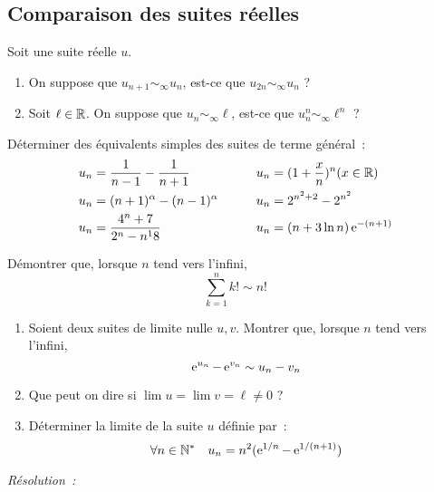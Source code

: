 \subsection{Comparaison des suites réelles}
\begin{exercice}
    Soit une suite réelle \(u\).
    \begin{enumerate}
        \item On suppose que \(u_{n+1} \sim_{\infty} u_n\), est-ce que \(u_{2n} \sim_{\infty} u_n\) ?
        \item Soit \(\ell \in \mathbb{R}\). On suppose que \(u_n \sim_{\infty} \ell\), est-ce que \(u_n^n \sim_{\infty} \ell^n\) ?
    \end{enumerate}
\end{exercice}
\begin{exercice}
    Déterminer des équivalents simples des suites de terme général~:
    \begin{align*}
        u_n & = \frac{1}{n-1} - \frac{1}{n+1} \qquad & u_n & = (1+\frac{x}{n})^n (x \in \mathbb{R}) \\
        u_n & = (n+1)^{\alpha} - (n-1)^{\alpha} \qquad & u_n & = 2^{n^2+2} -2^{n^2} \\
        u_n & = \frac{4^n+7}{2^n-n^18} \qquad & u_n & = (n+3\ln n)\operatorname{e}^{-(n+1)}
    \end{align*}
\end{exercice}
\begin{exercice}
    Démontrer que, lorsque \(n\) tend vers l'infini, \[\sum_{k=1}^n k! \sim n!\]
\end{exercice}
\begin{exercice}
    \begin{enumerate}
        \item Soient deux suites de limite nulle \(u, v\). Montrer que, lorsque \(n\) tend vers l'infini, \[\operatorname{e}^{u_n}-\operatorname{e}^{v_n} \sim u_n - v_n\]
        \item Que peut on dire si \(\lim u = \lim v = \ell \neq 0\) ?
        \item Déterminer la limite de la suite \(u\) définie par~:
            \[ \forall n \in \mathbb{N}^* \quad u_n = n^2 (\operatorname{e}^{1/n} - \operatorname{e}^{1/(n+1)})\]
    \end{enumerate}
\end{exercice}
\emph{Résolution~:}

